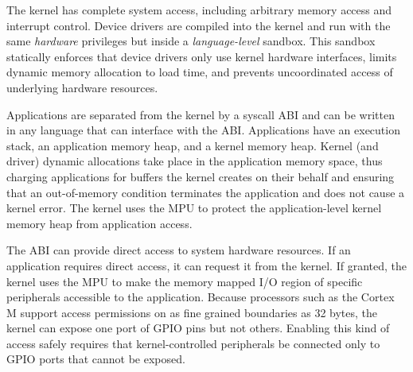 
The \name kernel has complete system access, including arbitrary memory
access and interrupt control. Device drivers are compiled into the kernel and
run with the same \emph{hardware} privileges but inside a
\emph{language-level} sandbox. This sandbox statically enforces that device
drivers only use kernel hardware interfaces, limits dynamic memory
allocation to load time, and prevents uncoordinated access of underlying
hardware resources.

Applications are separated from the kernel by a syscall ABI and can be
written in any language that can interface with the ABI. 
Applications have an execution stack, an application memory
heap, and a kernel memory heap. Kernel (and driver) dynamic allocations take
place in the application memory space, thus charging applications for buffers
the kernel creates on their behalf and ensuring that an out-of-memory
condition terminates the application and does not cause a kernel error. 
The kernel uses the MPU to protect the application-level kernel memory heap
from application access.

The ABI can provide direct access to system hardware resources. If an 
application requires direct access, it can request it from the kernel.
If granted, the kernel uses the MPU to make the memory mapped I/O region
of specific peripherals accessible to the application. Because processors
such as the Cortex M support access permissions on as fine grained boundaries
as 32 bytes, the kernel can expose one port of GPIO pins but not others.
Enabling this kind of access safely requires that kernel-controlled
peripherals be connected only to GPIO ports that cannot be exposed.



